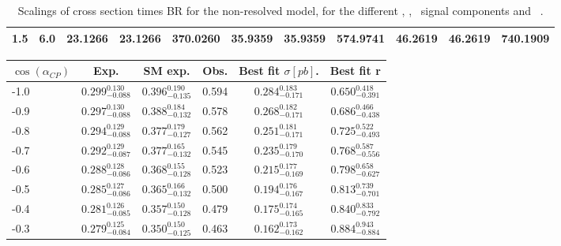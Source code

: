 \begin{landscape}
\begin{table}[h!]
\begin{tabular}{ll rrr rrr rrr}
   1.5 & 6.0    & 23.1266 & 23.1266 & 370.0260   & 35.9359 & 35.9359 & 574.9741   & 46.2619 & 46.2619 & 740.1909 \\\hline
    \end{tabular}                                                                                                                                                                          
    \caption[Scalings of $\sigma\times$BR for the signal components and \ ]{Scalings of cross section times BR for the non-resolved model, for the different \ttH, \tHq, \tHW\ signal components and \ .}\label{tab:xsbrscalingK6_1p5}                              
 \end{table}   

\end{landscape}

\begin{table}[h!]
  \centering
  \footnotesize
  \begin{tabular}{l| ccc | cc}\hline
    $\cos(\alpha_{CP})$& Exp.                     & SM exp.                  & Obs.  & Best fit $\sigma [pb]$.  & Best fit r               \\ \hline
    -1.0             & $0.299^{0.130}_{-0.088}$ & $0.396^{0.190}_{-0.135}$ & 0.594 & $0.284^{0.183}_{-0.171}$ & $0.650^{0.418}_{-0.391}$ \\
    -0.9             & $0.297^{0.130}_{-0.088}$ & $0.388^{0.184}_{-0.132}$ & 0.578 & $0.268^{0.182}_{-0.171}$ & $0.686^{0.466}_{-0.438}$ \\
    -0.8             & $0.294^{0.129}_{-0.088}$ & $0.377^{0.179}_{-0.127}$ & 0.562 & $0.251^{0.181}_{-0.171}$ & $0.725^{0.522}_{-0.493}$ \\
    -0.7             & $0.292^{0.129}_{-0.087}$ & $0.377^{0.165}_{-0.132}$ & 0.545 & $0.235^{0.179}_{-0.170}$ & $0.768^{0.587}_{-0.556}$ \\
    -0.6             & $0.288^{0.128}_{-0.086}$ & $0.368^{0.155}_{-0.128}$ & 0.523 & $0.215^{0.177}_{-0.169}$ & $0.798^{0.658}_{-0.627}$ \\
    -0.5             & $0.285^{0.127}_{-0.086}$ & $0.365^{0.166}_{-0.132}$ & 0.500 & $0.194^{0.176}_{-0.167}$ & $0.813^{0.739}_{-0.701}$ \\
    -0.4             & $0.281^{0.126}_{-0.085}$ & $0.357^{0.150}_{-0.128}$ & 0.479 & $0.175^{0.174}_{-0.165}$ & $0.840^{0.833}_{-0.792}$ \\
    -0.3             & $0.279^{0.125}_{-0.084}$ & $0.350^{0.150}_{-0.125}$ & 0.463 & $0.162^{0.173}_{-0.162}$ & $0.884^{0.943}_{-0.884}$ \\

\end{tabular}
\end{table}
